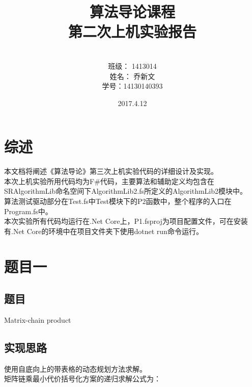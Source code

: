 \documentclass[a4paper]{article}
\begin{document}
\title{\Huge 算法导论课程\\ 第二次上机实验报告}
\author { \vspace{12cm} \\ \LARGE 班级：  1413014  \\ \LARGE 姓名：  乔新文   \\ \LARGE 学号：14130140393} 
\date{ \vspace{4cm} 2017.4.12}

\maketitle
\clearpage

\tableofcontents

\clearpage

\section{综述}

本文档将阐述《算法导论》第三次上机实验代码的详细设计及实现。\\

本次上机实验所用代码均为F\#代码，主要算法和辅助定义均包含在SRAlgorithmLib命名空间下AlgorithmLib2.fs所定义的AlgorithmLib2模块中。\\

算法测试驱动部分在Test.fs中Test模块下的P2函数中，整个程序的入口在Program.fs中。\\

本次实验所有代码均运行在.Net Core上，P1.fsproj为项目配置文件，可在安装有.Net Core的环境中在项目文件夹下使用dotnet run命令运行。\\

\section{题目一}

\subsection{题目}

Matrix-chain product

\subsection{实现思路}

使用自底向上的带表格的动态规划方法求解。\\
矩阵链乘最小代价括号化方案的递归求解公式为：
\end{document}
